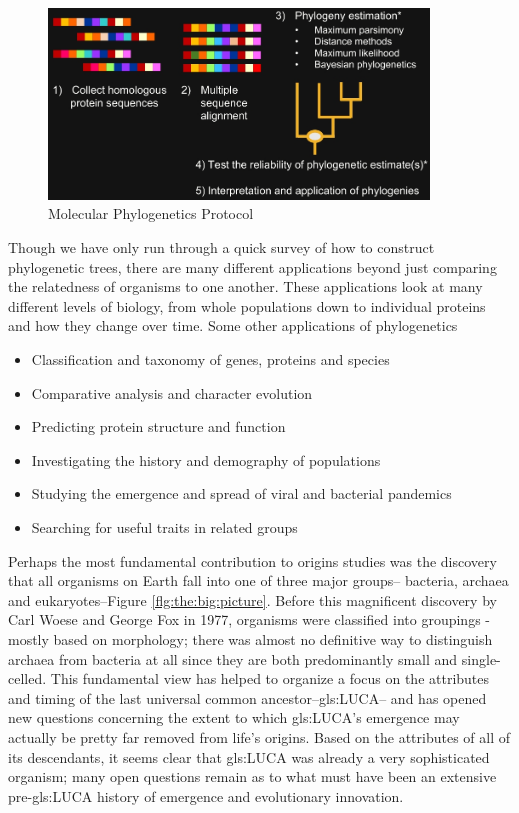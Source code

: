 \documentclass[]{article}
\begin{document}
\begin{figure}[H]
	\caption{Molecular Phylogenetics Protocol}\label{fig:MolecularPhylogeneticsProtocol}
	\includegraphics[width=0.9\textwidth]{MolecularPhylogeneticsProtocol}
\end{figure}
Though we have only run through
a quick survey
of how to construct phylogenetic trees,
there are many different applications
beyond just comparing the relatedness
of organisms to one another.
These applications look at
many different levels of biology,
from whole populations
down to individual proteins
and how they change over time.
Some other applications of phylogenetics
\begin{itemize}
	\item Classification and taxonomy of genes, proteins and species
	\item Comparative analysis and character evolution
	\item Predicting protein structure and function
	\item Investigating the history and demography of populations
	\item Studying the emergence and spread of viral and bacterial pandemics
	\item Searching for useful traits in related groups
\end{itemize}

Perhaps the most fundamental
contribution to origins studies
was the discovery that
all organisms on Earth
fall into one of three major groups--
bacteria, archaea and eukaryotes--Figure \ref{flg:the:big:picture}.
Before this magnificent discovery
by Carl Woese and George Fox in 1977,
organisms were classified into groupings -
mostly based on morphology; there was almost no definitive way
to distinguish archaea
from bacteria at all
since they are both predominantly
small and single-celled.
This fundamental view
has helped to organize a focus
on the attributes and timing
of the last universal common ancestor--\gls{gls:LUCA}--
and has opened new questions
concerning the extent to which
\gls{gls:LUCA}'s emergence may actually be
pretty far removed from life's origins.
Based on the attributes
of all of its descendants,
it seems clear that \gls{gls:LUCA} was already
a very sophisticated organism;
many open questions remain
as to what must have been
an extensive pre-\gls{gls:LUCA} history
of emergence and evolutionary innovation.
\end{document}
